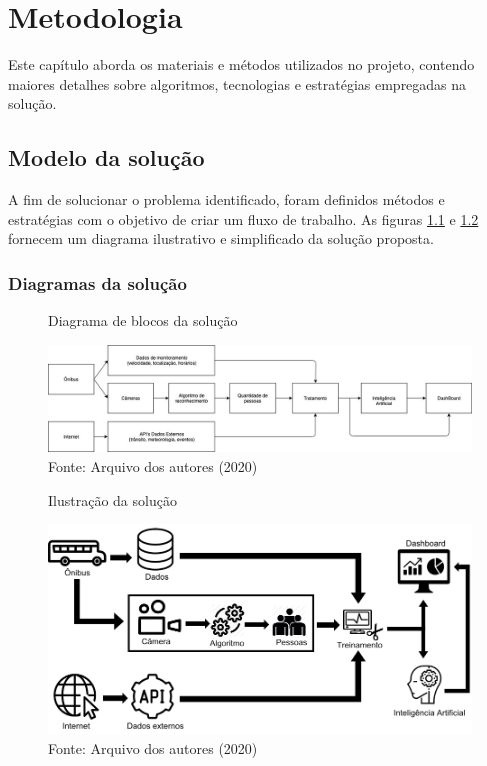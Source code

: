 \chapter{Metodologia}
\label{Cap:MateriaisMetodos}

\indent
\par Este capítulo aborda os materiais e métodos utilizados no projeto, contendo maiores detalhes sobre algoritmos, tecnologias e estratégias empregadas na solução.

\section{Modelo da solução}
\indent
\par A fim de solucionar o problema identificado, foram definidos métodos e estratégias com o objetivo de criar um fluxo de trabalho. As figuras \ref{diagramaDeBlocos} e \ref{DiagramaDeBlocosIcones} fornecem um diagrama ilustrativo e simplificado da solução proposta.
\subsection{Diagramas da solução}

\begin{figure}[H]
    \centering
    \caption{Diagrama de blocos da solução}
    \includegraphics[width=1.0\linewidth]{Imagens/diagramaDeBlocos.jpg}
    \caption*{Fonte: Arquivo dos autores (2020)}
    \label{diagramaDeBlocos}
\end{figure}

\begin{figure}[H]
    \centering
    \caption{Ilustração da solução}
    \includegraphics[width=1.0\linewidth]{Imagens/DiagramaDeBlocosIcones.png}
    \caption*{Fonte: Arquivo dos autores (2020)}
    \label{DiagramaDeBlocosIcones}
\end{figure}

